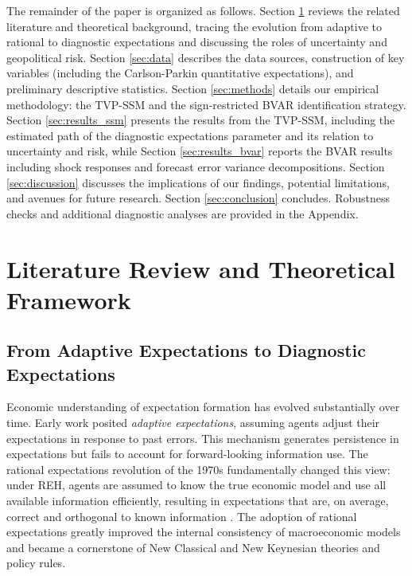 \documentclass[12pt]{article}
\begin{document}
The remainder of the paper is organized as follows. Section \ref{sec:lit} reviews the related literature and theoretical background, tracing the evolution from adaptive to rational to diagnostic expectations and discussing the roles of uncertainty and geopolitical risk. Section \ref{sec:data} describes the data sources, construction of key variables (including the Carlson-Parkin quantitative expectations), and preliminary descriptive statistics. Section \ref{sec:methods} details our empirical methodology: the TVP-SSM and the sign-restricted BVAR identification strategy. Section \ref{sec:results_ssm} presents the results from the TVP-SSM, including the estimated path of the diagnostic expectations parameter and its relation to uncertainty and risk, while Section \ref{sec:results_bvar} reports the BVAR results including shock responses and forecast error variance decompositions. Section \ref{sec:discussion} discusses the implications of our findings, potential limitations, and avenues for future research. Section \ref{sec:conclusion} concludes. Robustness checks and additional diagnostic analyses are provided in the Appendix.

\section{Literature Review and Theoretical Framework}\label{sec:lit}
\subsection{From Adaptive Expectations to Diagnostic Expectations}
Economic understanding of expectation formation has evolved substantially over time. Early work posited \textit{adaptive expectations}, assuming agents adjust their expectations in response to past errors. This mechanism generates persistence in expectations but fails to account for forward-looking information use. The rational expectations revolution of the 1970s \cite[e.g.,][]{Lucas1972} fundamentally changed this view: under REH, agents are assumed to know the true economic model and use all available information efficiently, resulting in expectations that are, on average, correct and orthogonal to known information \cite{Muth1961}. The adoption of rational expectations greatly improved the internal consistency of macroeconomic models and became a cornerstone of New Classical and New Keynesian theories and policy rules.
\end{document}
